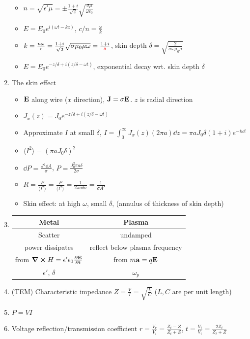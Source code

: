 \documentclass{article}
\theoremstyle{remark}
\theoremstyle{remark}
\begin{document}
\begin{enumerate}
\begin{itemize}
        \item $n=\sqrt{\epsilon'\mu}=\pm\frac{1+i}{\sqrt{2}}\sqrt{\frac{\sigma\mu}{\omega\epsilon_0}}$
        \item $E=E_0e^{i(\omega t-kz)}$, $c/n=\frac{\omega}{k}$
        \item $k=\frac{n\omega}{c}=\frac{1+i}{\sqrt{2}}\sqrt{\sigma\mu_0\mu\omega}=\frac{1+i}{\textcolor{red}{\delta}}$, skin depth $\boxed{\delta=\sqrt{\frac{2}{\sigma\omega\mu_0\mu}}}$
        \item $E=E_0e^{-z/\delta+i(z/\delta-\omega t)}$, exponential decay wrt. skin depth $\delta$
    \end{itemize}
    \item The skin effect \begin{itemize}
        \item $\vb{E}$ along wire ($x$ direction), $\vb{J}=\sigma\vb{E}$. $z$ is radial direction
        \item $J_x(z)=J_0e^{-z/\delta+i(z/\delta-\omega t)}$
        \item Approximate $I$ at small $\delta$, $I=\int_0^\infty J_x(z)(2\pi a)\dd z=\pi aJ_0\delta(1+i)e^{-i\omega t}$
        \item $\langle I^2\rangle=(\pi aJ_0\delta)^2$
        \item $\dd P=\frac{J^2\dd A}{\sigma}$, $P=\frac{J_0^2\pi a\delta}{2\sigma}$
        \item $R=\frac{P}{\langle I^2\rangle} = \frac{P}{\langle I^2\rangle}=\frac{1}{2\pi a\delta\sigma}=\frac{1}{\sigma A'}$
        \item Skin effect: at high $\omega$, small $\delta$,  (annulus of thickness of skin depth)
    \end{itemize}
    \item \begin{tabular}{c|c}
        Metal & Plasma\\
        \hline
        Scatter & undamped\\
        power dissipates & reflect below plasma frequency\\
        from $\curl H=\epsilon'\epsilon_0\pdv{\vb{E}}{t}$ & from $m\vb{a}=q\vb{E}$\\
        $\epsilon'$, $\delta$ & $\omega_p$
    \end{tabular}
    \item (TEM) Characteristic impedance $Z=\frac{V}{I}=\sqrt{\frac{L}{C}}$ ($L,C$ are per unit length)
    \item $P=VI$
    \item Voltage reflection/transmission coefficient $r=\frac{V_r}{V_i}=\frac{Z_t-Z}{Z_t+Z}$, $t=\frac{V_t}{V_i}=\frac{2Z_t}{Z_t+Z}$

\end{enumerate}
\end{document}
